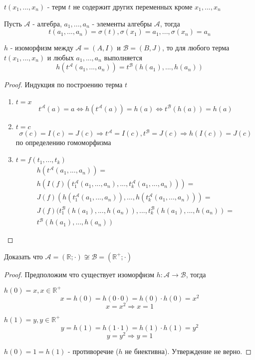 \documentclass[../main/document.tex]{subfiles}
\begin{document}
\begin{dfn}
$t(x_1,...,x_n)$ - терм $t$ не содержит других переменных кроме $x_1,...,x_n$
\end{dfn}
\begin{dfn}
Пусть $\mathcal{A}$ - алгебра, $a_1,...,a_n$ - элементы алгебры $\mathcal{A}$, тогда
$$t(a_1,...,a_n)=\sigma(t), \sigma(x_1)=a_1,...,\sigma(x_n)=a_n$$
\end{dfn}
\begin{thm}
$h$ - изоморфизм между $\mathcal{A}=(A,I)$ и $\mathcal{B}=(B,J)$, то для любого терма $t(x_1,...,x_n)$ и любых $a_1,...,a_n$ выполняется
$$h(t^{\mathcal{A}}(a_1,...,a_n))=t^{\mathcal{B}}(h(a_1),...,h(a_n))$$
\end{thm}
\begin{proof}
Индукция по построению терма $t$
\begin{enumerate}
\item $t=x$
$$t^{\mathcal{A}}(a)=a\Leftrightarrow h(t^{\mathcal{A}}(a))=h(a)\Leftrightarrow t^{\mathcal{B}}(h(a))=h(a)$$
\item $t=c$
$$\sigma(c)=I(c)=J(c)\Rightarrow t^{\mathcal{A}}=I(c), t^{\mathcal{B}}=J(c)\Rightarrow h(I(c))=J(c)$$
по определению гомоморфизма
\item $t=f(t_1,...,t_k)$
\begin{multline*}
h(t^{\mathcal{A}}(a_1,...,a_n))=\\
h(I(f)(t^{\mathcal{A}}_{1}(a_1,...,a_n),...,t^{\mathcal{A}}_{k}(a_1,...,a_n)))=\\
J(f)(h(t^{\mathcal{A}}_{1}(a_1,...,a_n)),...,h(t^{\mathcal{A}}_{k}(a_1,...,a_n)))=\\
J(f)(t^{\mathcal{B}}_{1}(h(a_1),...,h(a_n)),...,t^{\mathcal{B}}_{k}(h(a_1),...,h(a_n))=\\
t^{\mathcal{B}}(h(a_1),...,h(a_n))
\end{multline*}
\end{enumerate}
\end{proof}
\begin{exm}
Доказать что $\mathcal{A}=(\mathbb{R};\cdot)\not\cong\mathcal{B}=(\mathbb{R}^{+};\cdot)$
\begin{proof}
Предположим что существует изоморфизм $h:\mathcal{A}\rightarrow \mathcal{B}$, тогда

$h(0)=x, x\in \mathbb{R}^{+}$
$$x=h(0)=h(0\cdot 0)=h(0)\cdot h(0)=x^2$$
$$x=x^2\Rightarrow x=1$$

$h(1)=y, y\in \mathbb{R}^{+} $
$$y=h(1)=h(1\cdot 1)=h(1)\cdot h(1)=y^2$$
$$y=y^2\Rightarrow y=1$$

$h(0)=1=h(1)$ - противоречие ($h$ не биективна). Утверждение не верно.
\end{proof}
\end{exm}
\end{document}
